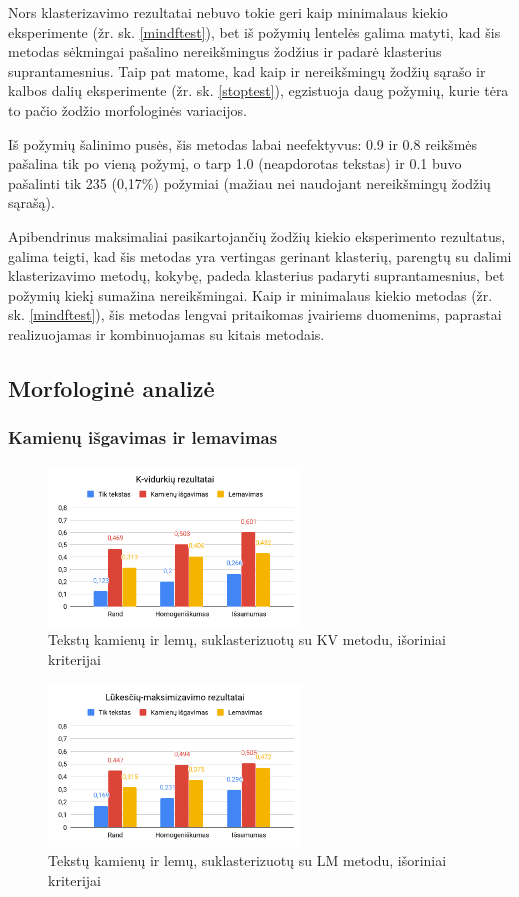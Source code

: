 \documentclass{VUMIFInfBakalaurinis}
\begin{document}
Nors klasterizavimo rezultatai nebuvo tokie geri kaip minimalaus kiekio eksperimente (žr. sk. \ref{mindftest}), bet iš požymių lentelės galima
matyti, kad šis metodas sėkmingai pašalino nereikšmingus žodžius ir
padarė klasterius suprantamesnius. Taip pat matome, kad kaip ir
 nereikšmingų žodžių sąrašo ir kalbos dalių eksperimente (žr. sk. \ref{stoptest}), egzistuoja
daug požymių, kurie tėra to pačio žodžio morfologinės variacijos.

Iš požymių šalinimo pusės, šis metodas labai neefektyvus: 0.9 ir 0.8
reikšmės pašalina tik po vieną požymį, o tarp 1.0 (neapdorotas tekstas)
ir 0.1 buvo pašalinti tik 235 (0,17\%) požymiai (mažiau nei naudojant
nereikšmingų žodžių sąrašą).

Apibendrinus maksimaliai pasikartojančių žodžių kiekio eksperimento
rezultatus, galima teigti, kad šis metodas yra vertingas gerinant
klasterių, parengtų su dalimi klasterizavimo metodų, kokybę, padeda
klasterius padaryti suprantamesnius, bet požymių kiekį sumažina
nereikšmingai. Kaip ir minimalaus kiekio metodas (žr. sk. \ref{mindftest}), šis
metodas lengvai pritaikomas įvairiems duomenims, paprastai realizuojamas
ir kombinuojamas su kitais metodais.

\subsection{Morfologinė analizė}

\subsubsection{Kamienų išgavimas ir lemavimas}

\begin{figure}[H]
	\centering
	\includegraphics[width=0.6\textwidth]{./img/image14.png}
  \caption{Tekstų kamienų ir lemų, suklasterizuotų su KV metodu, išoriniai
  kriterijai}
\end{figure}

\begin{figure}[H]
	\centering
	\includegraphics[width=0.6\textwidth]{./img/image17.png}
  \caption{Tekstų kamienų ir lemų, suklasterizuotų su LM metodu, išoriniai
  kriterijai}
\end{figure}
\end{document}
